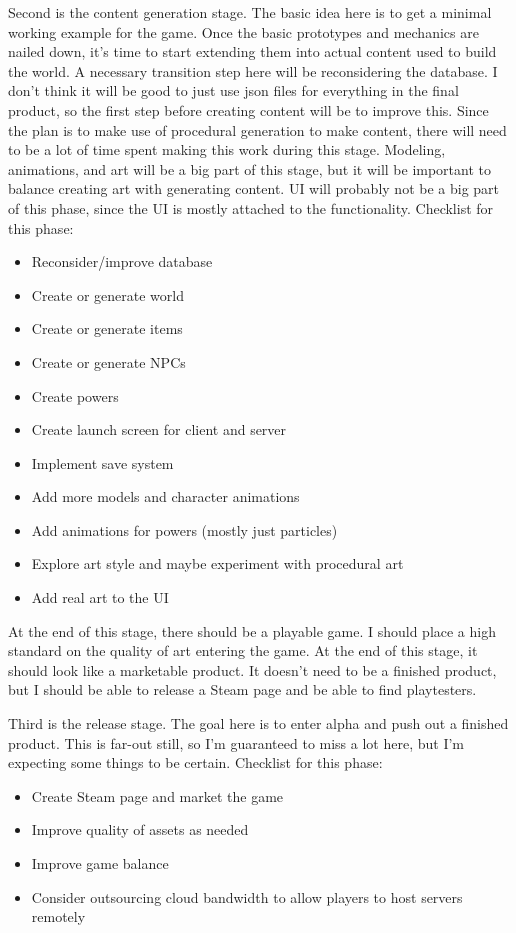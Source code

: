 \documentclass{article}
\begin{document}
Second is the content generation stage. The basic idea here is to get a minimal working
example for the game. Once the basic prototypes and mechanics are nailed down,
it's time to start extending them into actual content used to build the world.
A necessary transition step here will be reconsidering the database. I don't think
it will be good to just use json files for everything in the final product, so the first
step before creating content will be to improve this. Since the plan is to make use of procedural
generation to make content, there will need to be a lot of time spent making this work during
this stage. Modeling, animations, and art will be a big part of this stage, but it will be
important to balance creating art with generating content. UI will probably not be a big
part of this phase, since the UI is mostly attached to the functionality.
Checklist for this phase:
\begin{itemize}
    \item Reconsider/improve database
    \item Create or generate world
    \item Create or generate items
    \item Create or generate NPCs
    \item Create powers
    \item Create launch screen for client and server
    \item Implement save system
    \item Add more models and character animations
    \item Add animations for powers (mostly just particles)
    \item Explore art style and maybe experiment with procedural art
    \item Add real art to the UI
\end{itemize}
At the end of this stage, there should be a playable game.
I should place a high standard on the quality of art entering the game. At the end of this stage,
it should look like a marketable product. It doesn't need to be a finished product, but I should
be able to release a Steam page and be able to find playtesters.

Third is the release stage. The goal here is to enter alpha and push out a finished product.
This is far-out still, so I'm guaranteed to miss a lot here, but I'm expecting some things to
be certain.
Checklist for this phase:
\begin{itemize}
    \item Create Steam page and market the game
    \item Improve quality of assets as needed
    \item Improve game balance
    \item Consider outsourcing cloud bandwidth to allow players to host servers remotely
\end{itemize}
\end{document}

